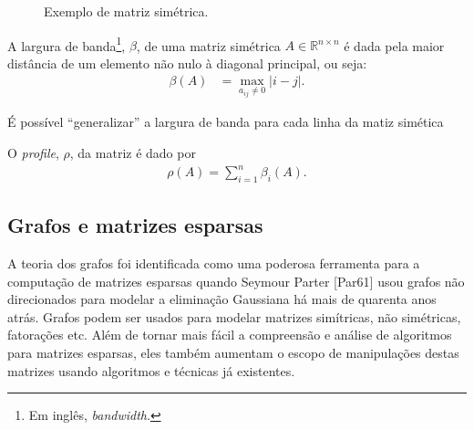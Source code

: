 \begin{figure}[!htb]
    \centering
    \caption{Exemplo de matriz simétrica.}
    \label{fig:exem_matriz_simetrica}
\end{figure}
A largura de banda\footnote{Em inglês, \textit{bandwidth}.}, $\beta$, de uma matriz simétrica $A \in \mathbb{R}^{n \times n}$ é dada pela maior distância de um elemento não nulo à diagonal principal, ou seja:
\begin{align*}
    \beta(A) &= \max_{a_{ij} \neq 0} | i - j |.
\end{align*}

É possível ``generalizar'' a largura de banda para cada linha da matiz simética

O \textit{profile}, $\rho$, da matriz é dado por
\begin{align*}
    \rho(A) = \sum_{i = 1}^n \beta_i(A).
\end{align*}
\subsection{Grafos e matrizes esparsas}
A teoria dos grafos foi identificada como uma poderosa ferramenta para a computação de matrizes esparsas quando Seymour Parter [Par61] usou grafos não direcionados para modelar a eliminação Gaussiana há mais de quarenta anos atrás. Grafos podem ser usados para modelar matrizes simítricas, não simétricas, fatorações etc. Além de tornar mais fácil a compreensão e análise de algoritmos para matrizes esparsas, eles também aumentam o escopo de manipulações destas matrizes usando algoritmos e técnicas já existentes.

